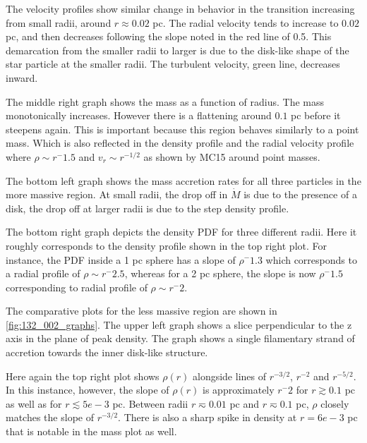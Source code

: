 \documentclass{emulateapj}
\begin{document}
The velocity profiles show similar change in behavior in the transition increasing from small radii, around $r\approx 0.02$ pc.  The radial velocity tends to increase to $0.02$ pc, and then decreases following the slope noted in the red line of 0.5.  This demarcation from the smaller radii to larger is due to the disk-like shape of the star particle at the smaller radii.  The turbulent velocity, green line, decreases inward.  

The middle right graph shows the mass as a function of radius.  The mass monotonically increases.  However there is a flattening around $0.1$ pc before it steepens again.  This is important because this region behaves similarly to a point mass.  Which is also reflected in the density profile and the radial velocity profile where $\rho \sim r^-1.5$ and $v_r \sim r^{-1/2}$ as shown by MC15 around point masses.  

The bottom left graph shows the mass accretion rates for all three particles in the more massive region.  At small radii, the drop off in $\dot M$ is due to the presence of a disk, the drop off at larger radii is due to the step density profile.  

The bottom right graph depicts the density PDF for three different radii.  Here it roughly corresponds to the density profile shown in the top right plot.  For instance, the PDF inside a 1 pc sphere has a slope of $\rho ^-1.3$ which corresponds to a radial profile of $\rho \sim r^-2.5$, whereas for a 2 pc sphere, the slope is now $\rho ^-1.5$ corresponding to radial profile of $\rho \sim r^-2$.  

The comparative plots for the less massive region are shown in \ref{fig:132_002_graphs}.  The upper left graph shows a slice perpendicular to the z axis in the plane of peak density.  The graph shows a single filamentary strand of accretion towards the inner disk-like structure.  

Here again the top right plot shows $\rho(r)$ alongside lines of $r^{-3/2}$, $r^{-2}$ and $r^{-5/2}$.  In this instance, however, the slope of $\rho(r)$ is approximately $r^-2$ for $r \gtrsim 0.1$ pc as well as for $r \lesssim 5e-3$ pc.  Between radii $r \eqsim 0.01$ pc and $r \eqsim 0.1$ pc, $\rho$ closely matches the slope of $r^{-3/2}$.  There is also a sharp spike in density at $r = 6e-3$ pc that is notable in the mass plot as well.      
\end{document}
